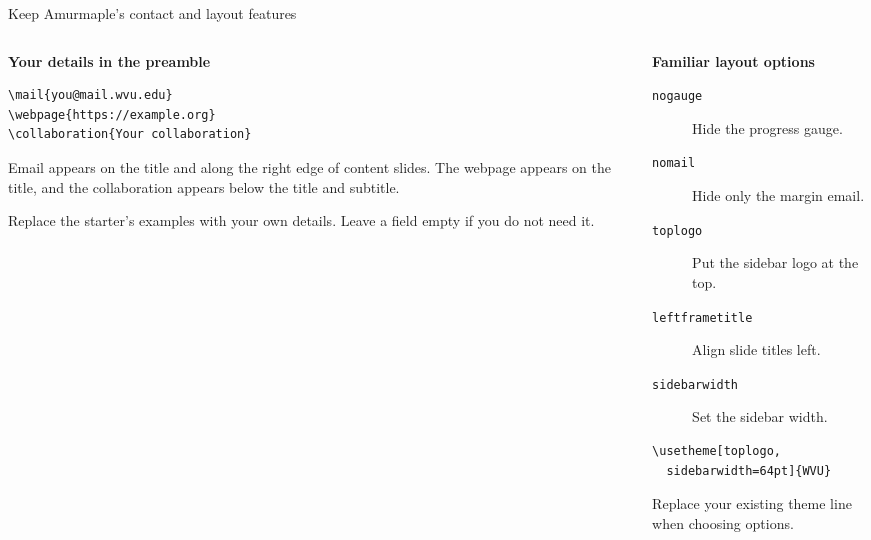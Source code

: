 \begin{frame}[fragile]{Keep Amurmaple's contact and layout features}
  \begin{columns}[T,onlytextwidth]
    \begin{column}{.50\textwidth}
      \textbf{Your details in the preamble}
      {\small
\begin{verbatim}
\mail{you@mail.wvu.edu}
\webpage{https://example.org}
\collaboration{Your collaboration}
\end{verbatim}
      }
      Email appears on the title and along the right edge of content
      slides. The webpage appears on the title, and the collaboration
      appears below the title and subtitle.
      \medskip

      Replace the starter's examples with your own details. Leave a field
      empty if you do not need it.
    \end{column}
    \begin{column}{.46\textwidth}
      \textbf{Familiar layout options}
      \begin{description}
        \item[\texttt{nogauge}] Hide the progress gauge.
        \item[\texttt{nomail}] Hide only the margin email.
        \item[\texttt{toplogo}] Put the sidebar logo at the top.
        \item[\texttt{leftframetitle}] Align slide titles left.
        \item[\texttt{sidebarwidth}] Set the sidebar width.
      \end{description}
      {\small
\begin{verbatim}
\usetheme[toplogo,
  sidebarwidth=64pt]{WVU}
\end{verbatim}
      }
      Replace your existing theme line when choosing options.
    \end{column}
  \end{columns}
\end{frame}

